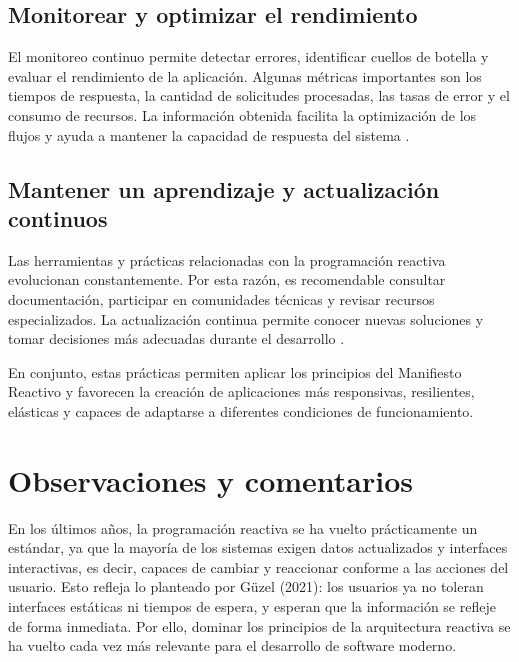\documentclass[12pt, letterpaper]{article}
\begin{document}
\subsection*{Monitorear y optimizar el rendimiento}
El monitoreo continuo permite detectar errores, identificar cuellos de botella y evaluar el rendimiento de la aplicación. Algunas métricas importantes son los tiempos de respuesta, la cantidad de solicitudes procesadas, las tasas de error y el consumo de recursos. La información obtenida facilita la optimización de los flujos y ayuda a mantener la capacidad de respuesta del sistema \parencites{saeed2025reactive}{aiimtech2024understanding}.

\subsection*{Mantener un aprendizaje y actualización continuos}
Las herramientas y prácticas relacionadas con la programación reactiva evolucionan constantemente. Por esta razón, es recomendable consultar documentación, participar en comunidades técnicas y revisar recursos especializados. La actualización continua permite conocer nuevas soluciones y tomar decisiones más adecuadas durante el desarrollo \parencite{sousa2025java}.

En conjunto, estas prácticas permiten aplicar los principios del Manifiesto Reactivo y favorecen la creación de aplicaciones más responsivas, resilientes, elásticas y capaces de adaptarse a diferentes condiciones de funcionamiento.

\section*{Observaciones y comentarios}
En los últimos años, la programación reactiva se ha vuelto prácticamente un estándar, ya que la mayoría de los sistemas exigen datos actualizados y interfaces interactivas, es decir, capaces de cambiar y reaccionar conforme a las acciones del usuario. Esto refleja lo planteado por Güzel (2021): los usuarios ya no toleran interfaces estáticas ni tiempos de espera, y esperan que la información se refleje de forma inmediata. Por ello, dominar los principios de la arquitectura reactiva se ha vuelto cada vez más relevante para el desarrollo de software moderno.

\end{document}
